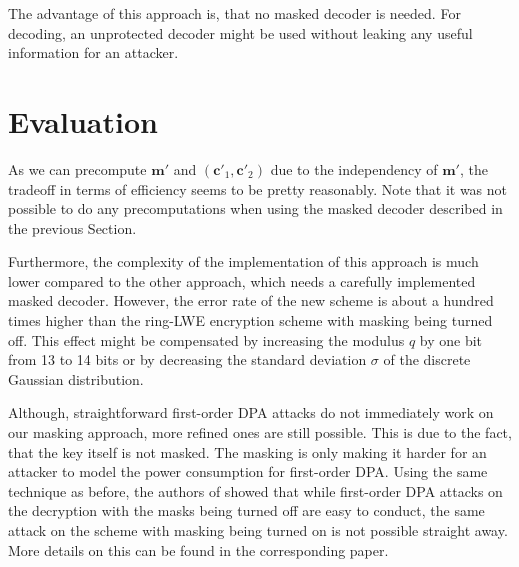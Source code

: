 The advantage of this approach is, that no masked decoder is needed. For decoding, an unprotected decoder might be used without leaking any useful information for an attacker.

\section{Evaluation}
As we can precompute \(\textbf{m}'\) and \((\textbf{c}'_1, \textbf{c}'_2)\) due to the independency of \(\textbf{m}'\), the tradeoff in terms of efficiency seems to be pretty reasonably. Note that it was not possible to do any precomputations when using the masked decoder described in the previous Section.

Furthermore, the complexity of the implementation of this approach is much lower compared to the other approach, which needs a carefully implemented masked decoder. However, the error rate of the new scheme is about a hundred times higher than the \ac{ring-LWE} encryption scheme with masking being turned off. This effect might be compensated by increasing the modulus \(q\) by one bit from 13 to 14 bits or by decreasing the standard deviation \(\sigma\) of the discrete Gaussian distribution.

Although, straightforward first-order \ac{DPA} attacks do not immediately work on our masking approach, more refined ones are still possible. This is due to the fact, that the key itself is not masked. The masking is only making it harder for an attacker to model the power consumption for first-order \ac{DPA}. Using the same technique as before, the authors of \cite{Reparaz2016} showed that while first-order \ac{DPA} attacks on the decryption with the masks being turned off are easy to conduct, the same attack on the scheme with masking being turned on is not possible straight away. More details on this can be found in the corresponding paper.


